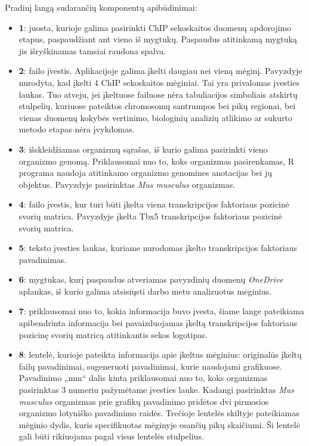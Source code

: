 \documentclass[12pt]{article}
\begin{document}
Pradinį langą sudarančių komponentų apibūdinimai:
\begin{itemize}
    \item \textbf{\large{1}}: juosta, kurioje galima pasirinkti ChIP
        sekoskaitos duomenų apdorojimo etapus, paspaudžiant ant vieno iš
        mygtukų. Paspaudus atitinkamą mygtuką jis išryškinamas tamsiai raudona
        spalva.
    \item \textbf{\large{2}}: failo įvestis. Aplikacijoje galima įkelti daugiau
        nei vieną mėginį. Pavyzdyje nurodyta, kad įkelti 4 ChIP sekoskaitos
        mėginiai. Tai yra privalomas įvesties laukas. Tuo atveju, jei
        įkeltuose failuose nėra tabuliacijos simboliais atskirtų stulpelių,
        kuriuose pateiktos chromosomų santrumpos bei pikų regionai, bei vienas
        duomenų kokybės vertinimo, biologinių analizių atlikimo ar sukurto
        metodo etapas nėra įvykdomas.
    \item \textbf{\large{3}}: išskleidžiamas organizmų sąrašas, iš kurio
        galima pasirinkti vieno organizmo genomą. Priklausomai nuo to, koks
        organizmas pasirenkamas, R programa naudoja atitinkamo organizmo
        genomines anotacijas bei jų objektus. Pavyzdyje pasirinktas
        \emph{Mus musculus} organizmas.
    \item \textbf{\large{4}}: failo įvestis, kur turi būti įkelta viena
        transkripcijos faktoriaus pozicinė svorių matrica. Pavyzdyje įkelta
        Tbx5 transkripcijos faktoriaus pozicinė svorių matrica.
    \item \textbf{\large{5}}: teksto įvesties laukas, kuriame nurodomas
        įkelto transkripcijos faktoriaus pavadinimas.
    \item \textbf{\large{6}}: mygtukas, kurį paspaudus atveriamas pavyzdinių
        duomenų \emph{OneDrive} aplankas, iš kurio galima atsisiųsti darbo
        metu analizuotus mėginius.
    \item \textbf{\large{7}}: priklausomai nuo to, kokia informacija buvo
        įvesta, šiame lange pateikiama apibendrinta informacija bei
        pavaizduojamas įkeltą transkripcijos faktoriaus pozicinę svorių
        matricą atitinkantis sekos logotipas.
    \item \textbf{\large{8}}: lentelė, kurioje pateikta informacija apie įkeltus
        mėginius: originalūs įkeltų failų pavadinimai, sugeneruoti pavadinimai,
        kurie naudojami grafikuose. Pavadinimo „mm“ dalis kinta priklausomai
        nuo to, koks organizmas pasirinktas 3 numeriu pažymėtame įvesties
        lauke. Kadangi pasirinktas \emph{Mus musculus} organizmas prie grafikų
        pavadinimo pridėtos dvi pirmosios organizmo lotyniško pavadinimo raidės.
        Trečioje lentelės skiltyje pateikiamas mėginio dydis, kuris
        specifikuotas mėginyje esančių pikų skaičiumi. Ši lentelė gali būti
        rikiuojama pagal visus lentelės stulpelius.
\end{itemize}
\end{document}
